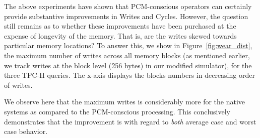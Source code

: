The above experiments have shown that PCM-conscious operators can
certainly provide substantive improvements in Writes and Cycles. However,
the question still remains as to whether these improvements have been
purchased at the expense of longevity of the memory. That is, are the
writes skewed towards particular memory locations?  To answer this, we
show in Figure~\ref{fig:wear_dist}, the maximum number of writes  across
all memory blocks (as mentioned earlier, we track writes at the block
level (256 bytes) in our modified simulator), for the three TPC-H queries. The x-axis displays the blocks numbers in decreasing order of writes.

We observe here that the maximum writes is considerably more for the
native systems as compared to the PCM-conscious processing. This
conclusively demonstrates that the improvement is with regard to
\emph{both} average case and worst case behavior.


\begin{comment}
Note that it is possible to achieve this lifetime only when the writes
are perfectly levelled across the entire PCM. In practice, however,
there is a degree of skewness in the writes of most algorithms. Due to
this skew, an algorithm might cut short the PCM lifetime considerably
despite doing well on the overall writes, since a particular set of
locations are written to repeatedly. Hence, characterizing the write
skew is fundamental to determining PCM durability.

As mentioned earlier, we track writes at the block level (256B) in our
modified simulator.  In Figure~\ref{fig:wear_dist}, we show the 
write frequencies of the top 100 blocks for the different operators.

As we can see, in the case of hash join, our PCM-conscious algorithms have
almost the same uniform distribution as the native algorithms. though the
initial part of the writes are slightly higher. This is in those cases
when the bitmap used for maintaining the slot occupancy information for
pages in the hash table is evicted intermediately between bit updates,
thereby incurring higher number of writes for that line.

For group-by (using sort), the per block writes due to our algorithms
are consistently lower than the native algorithms by about $39\%$. The
reason for this is that sorting incurs multiple writes for the same
block when all the input tuples cannot fit in DRAM, which the aspect of
partitioning saves in our PCM-conscious algorithms.

\begin{figure}[htbp]
	\psfig{figure=wear_dist.png, width = 9cm}\centering
	\caption{Operators Wear Distribution }
	\label{fig:wear_dist}
\end{figure} 
\end{comment}

